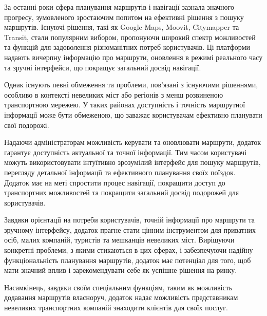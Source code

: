 
За останні роки сфера планування маршрутів і навігації зазнала значного прогресу, зумовленого зростаючим попитом на ефективні рішення з пошуку маршрутів. Існуючі рішення, такі як Google Maps, Moovit, Citymapper та Transit, стали популярним вибором, пропонуючи широкий спектр можливостей та функцій для задоволення різноманітних потреб користувачів. Ці платформи надають вичерпну інформацію про маршрути, оновлення в режимі реального часу та зручні інтерфейси, що покращує загальний досвід навігації.

Однак існують певні обмеження та проблеми, пов'язані з існуючими рішеннями, особливо в контексті невеликих міст або регіонів з менш розвиненою транспортною мережею. У таких районах доступність і точність маршрутної інформації може бути обмеженою, що заважає користувачам ефективно планувати свої подорожі.

Надаючи адміністраторам можливість керувати та оновлювати маршрути, додаток гарантує доступність актуальної та точної інформації. Тим часом користувачі можуть використовувати інтуїтивно зрозумілий інтерфейс для пошуку маршрутів, перегляду детальної інформації та ефективного планування своїх поїздок. Додаток має на меті спростити процес навігації, покращити доступ до транспортних можливостей та покращити загальний досвід подорожей для користувачів.

Завдяки орієнтації на потреби користувачів, точній інформації про маршрути та зручному інтерфейсу, додаток прагне стати цінним інструментом для приватних осіб, малих компаній, туристів та мешканців невеликих міст. Вирішуючи конкретні проблеми, з якими стикаються в цих сферах, і забезпечуючи надійну функціональність планування маршрутів, додаток має потенціал для того, щоб мати значний вплив і зарекомендувати себе як успішне рішення на ринку.

Насамкінець, завдяки своїм спеціальним функціям, таким як можливість додавання маршрутів власноруч, додаток надає можливість представникам невеликих транспортних компаній знаходити клієнтів для своїх послуг.